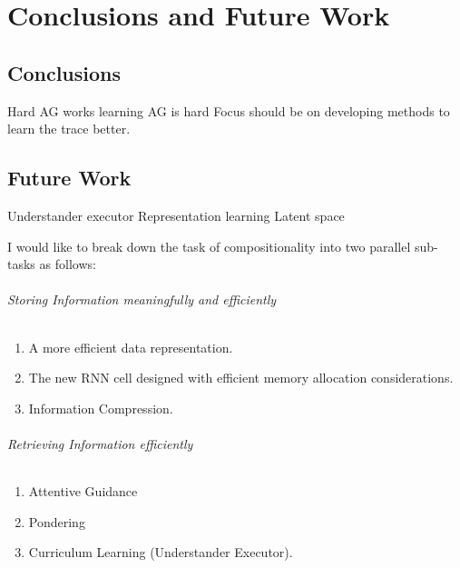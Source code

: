 \chapter{Conclusions and Future Work} \label{Chapter:conclusion}%

\section{Conclusions}
Hard AG works
learning AG is hard
Focus should be on developing methods to learn the trace better.



\section{Future Work}
Understander executor
Representation learning
Latent space

I would like to break down the task of compositionality into two parallel sub-tasks as follows:

\subparagraph{Storing Information meaningfully and efficiently}
\begin{enumerate}
	\item A more efficient data representation.
	\item The new RNN cell designed with efficient memory allocation considerations.
	\item Information Compression.		
\end{enumerate}
\subparagraph{Retrieving Information efficiently}
\begin{enumerate}
	\item Attentive Guidance	
	\item Pondering
	\item Curriculum Learning (Understander Executor).
\end{enumerate}